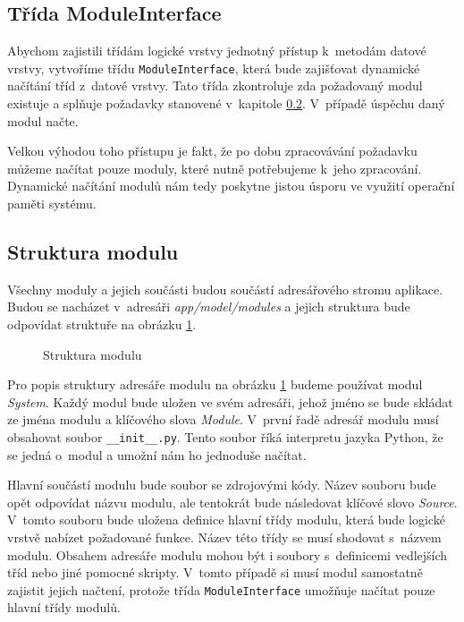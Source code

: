     \subsection{Třída ModuleInterface}
    Abychom zajistili třídám logické vrstvy jednotný přístup k~metodám datové vrstvy, vytvoříme třídu \verb|ModuleInterface|, která bude zajišťovat dynamické načítání tříd z~datové vrstvy. Tato třída zkontroluje zda požadovaný modul existuje a splňuje požadavky stanovené v~kapitole \ref{package}. V~případě úspěchu daný modul načte.

    Velkou výhodou toho přístupu je fakt, že po dobu zpracovávání požadavku můžeme načítat pouze moduly, které nutně potřebujeme k~jeho zpracování. Dynamické načítání modulů nám tedy poskytne jistou úsporu ve využití operační paměti systému.
    \subsection{Struktura modulu}
    \label{package}
    Všechny moduly a jejich součásti budou součástí adresářového stromu aplikace. Budou se nacházet v~adresáři \emph{app/model/modules} a jejich struktura bude odpovídat struktuře na obrázku \ref{module}.
    \begin{figure}
      \centering
      \caption{Struktura modulu}
      \label{module}
    \end{figure}

    Pro popis struktury adresáře modulu na obrázku \ref{module} budeme používat modul \emph{System}. Každý modul bude uložen ve svém adresáři, jehož jméno se bude skládat ze jména modulu a klíčového slova \emph{Module}. V~první řadě adresář modulu musí obsahovat soubor \verb|__init__.py|. Tento soubor říká interpretu jazyka Python, že se jedná o~modul a umožní nám ho jednoduše načítat.

    Hlavní součástí modulu bude soubor se zdrojovými kódy. Název souboru bude opět odpovídat názvu modulu, ale tentokrát bude následovat klíčové slovo \emph{Source}.
    V~tomto souboru bude uložena definice hlavní třídy modulu, která bude logické vrstvě nabízet požadované funkce. Název této třídy se musí shodovat s~názvem modulu. Obsahem adresáře modulu mohou být i soubory s~definicemi vedlejších tříd nebo jiné pomocné skripty. V~tomto případě si musí modul samostatně zajistit jejich načtení, protože třída \verb|ModuleInterface| umožňuje načítat pouze hlavní třídy modulů.

